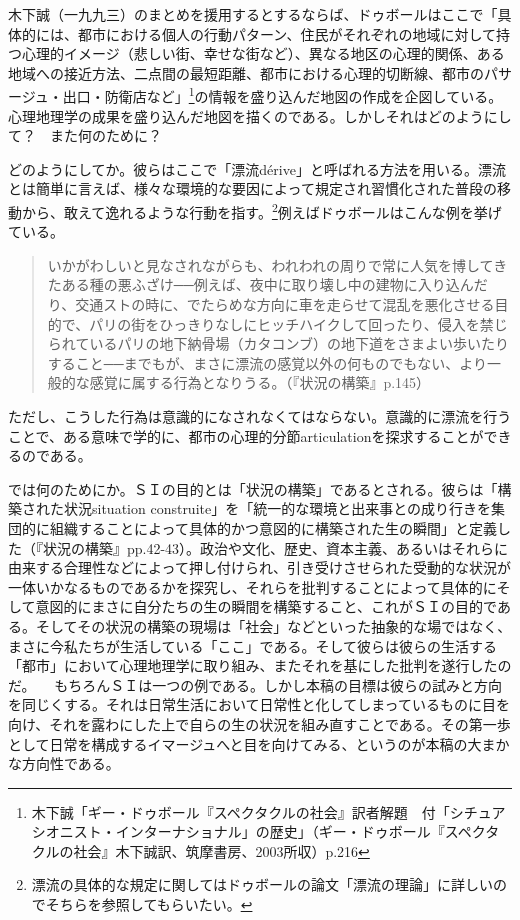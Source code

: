\documentclass[b5j,twoside,twocolumn]{utarticle}
\begin{document}
木下誠（一九九三）のまとめを援用するとするならば、ドゥボールはここで「具体的には、都市における個人の行動パターン、住民がそれぞれの地域に対して持つ心理的イメージ（悲しい街、幸せな街など）、異なる地区の心理的関係、ある地域への接近方法、二点間の最短距離、都市における心理的切断線、都市のパサージュ・出口・防衛店など」\footnote{木下誠「ギー・ドゥボール『スペクタクルの社会』訳者解題　付「シチュアシオニスト・インターナショナル」の歴史」（ギー・ドゥボール『スペクタクルの社会』木下誠訳、筑摩書房、2003所収）p.216}の情報を盛り込んだ地図の作成を企図している。心理地理学の成果を盛り込んだ地図を描くのである。しかしそれはどのようにして？　また何のために？


どのようにしてか。彼らはここで「漂流dérive」と呼ばれる方法を用いる。漂流とは簡単に言えば、様々な環境的な要因によって規定され習慣化された普段の移動から、敢えて逸れるような行動を指す。\footnote{漂流の具体的な規定に関してはドゥボールの論文「漂流の理論」に詳しいのでそちらを参照してもらいたい。}例えばドゥボールはこんな例を挙げている。
\begin{quote}
いかがわしいと見なされながらも、われわれの周りで常に人気を博してきたある種の悪ふざけ──例えば、夜中に取り壊し中の建物に入り込んだり、交通ストの時に、でたらめな方向に車を走らせて混乱を悪化させる目的で、パリの街をひっきりなしにヒッチハイクして回ったり、侵入を禁じられているパリの地下納骨場（カタコンブ）の地下道をさまよい歩いたりすること──までもが、まさに漂流の感覚以外の何ものでもない、より一般的な感覚に属する行為となりうる。（『状況の構築』p.145）
\end{quote}
ただし、こうした行為は意識的になされなくてはならない。意識的に漂流を行うことで、ある意味で学的に、都市の心理的分節articulationを探求することができるのである。


では何のためにか。ＳＩの目的とは「状況の構築」であるとされる。彼らは「構築された状況situation construite」を「統一的な環境と出来事との成り行きを集団的に組織することによって具体的かつ意図的に構築された生の瞬間」と定義した（『状況の構築』pp.42-43）。政治や文化、歴史、資本主義、あるいはそれらに由来する合理性などによって押し付けられ、引き受けさせられた受動的な状況が一体いかなるものであるかを探究し、それらを批判することによって具体的にそして意図的にまさに自分たちの生の瞬間を構築すること、これがＳＩの目的である。そしてその状況の構築の現場は「社会」などといった抽象的な場ではなく、まさに今私たちが生活している「ここ」である。そして彼らは彼らの生活する「都市」において心理地理学に取り組み、またそれを基にした批判を遂行したのだ。
　もちろんＳＩは一つの例である。しかし本稿の目標は彼らの試みと方向を同じくする。それは日常生活において日常性と化してしまっているものに目を向け、それを露わにした上で自らの生の状況を組み直すことである。その第一歩として日常を構成するイマージュへと目を向けてみる、というのが本稿の大まかな方向性である。
\end{document}
